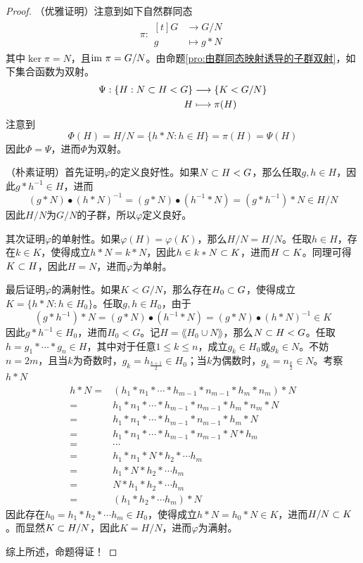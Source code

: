 \begin{proof}
	（优雅证明）注意到如下自然群同态
	\begin{align*}
		\pi:\begin{aligned}[t]
			G&\longrightarrow G/N\\
			g&\longmapsto g*N
		\end{aligned}
	\end{align*}
	其中$\ker\pi=N$，且$\text{im } \pi=G/N$。由命题\ref{pro:由群同态映射诱导的子群双射}，如下集合函数为双射。
	\begin{align*}
		\Psi:\begin{aligned}[t]
			\{ H:N\subset H<G \}&\longrightarrow \{ K<G/N \}\\
			H&\longmapsto \pi(H)
		\end{aligned}
	\end{align*}
	注意到
	$$
	\Phi(H)=H/N=\{ h*N:h\in H \}=\pi(H)=\Psi(H)
	$$
	因此$\Phi=\Psi$，进而$\Phi$为双射。
	
	（朴素证明）首先证明$\varphi$的定义良好性。如果$N\subset H < G$，那么任取$g,h\in H$，因此$g*h^{-1}\in H$，进而
	$$
	(g*N)\bullet(h*N)^{-1}=(g*N)\bullet(h^{-1}*N)=(g*h^{-1})*N\in H/N
	$$
	因此$H/N$为$G/N$的子群，所以$\varphi$定义良好。
	
	其次证明$\varphi$的单射性。如果$\varphi(H)=\varphi(K)$，那么$H/N=H/N$。任取$h\in H$，存在$k\in K$，使得成立$h*N=k*N$，因此$h\in k*N\subset K$，进而$H\subset K$。同理可得$K\subset H$，因此$H=N$，进而$\varphi$为单射。
	
	最后证明$\varphi$的满射性。如果$K<G/N$，那么存在$H_0\subset G$，使得成立$K=\{ h*N:h\in H_0 \}$。任取$g,h\in H_0$，由于
	$$
	(g*h^{-1})*N=(g*N)\bullet(h^{-1}*N)=(g*N)\bullet(h*N)^{-1}\in K
	$$
	因此$g*h^{-1}\in H_0$，进而$H_0<G$。记$H=\lang H_0\cup N \rang$，那么$N\subset H<G$。任取$h=g_1*\cdots* g_n\in H$，其中对于任意$1\le k\le n$，成立$g_k\in H_0$或$g_k\in N$。不妨$n=2m$，且当$k$为奇数时，$g_k=h_{\frac{k+1}{2}}\in H_0$；当$k$为偶数时，$g_k=n_{\frac{k}{2}}\in N$。考察$h*N$
	\begin{align*}
		h*N=&(h_1*n_1*\cdots *h_{m-1}*n_{m-1}*h_m*n_m)*N\\
		= & h_1*n_1*\cdots *h_{m-1}*n_{m-1}*h_m*n_m*N\\
		= & h_1*n_1*\cdots *h_{m-1}*n_{m-1}*h_m*N\\
		= & h_1*n_1*\cdots *h_{m-1}*n_{m-1}*N*h_m\\
		= & \cdots\\
		= & h_1*n_1*N*h_{2}*\cdots h_{m}\\
		= & h_1*N*h_{2}*\cdots h_{m}\\
		= & N*h_1*h_{2}*\cdots h_{m}\\
		= & (h_1*h_{2}*\cdots h_{m})*N
	\end{align*}
	因此存在$h_0=h_1*h_{2}*\cdots h_{m}\in H_0$，使得成立$h*N=h_0*N\in K$，进而$H/N\subset K$。而显然$K\subset H/N$，因此$K=H/N$，进而$\varphi$为满射。
	
	综上所述，命题得证！
\end{proof}

